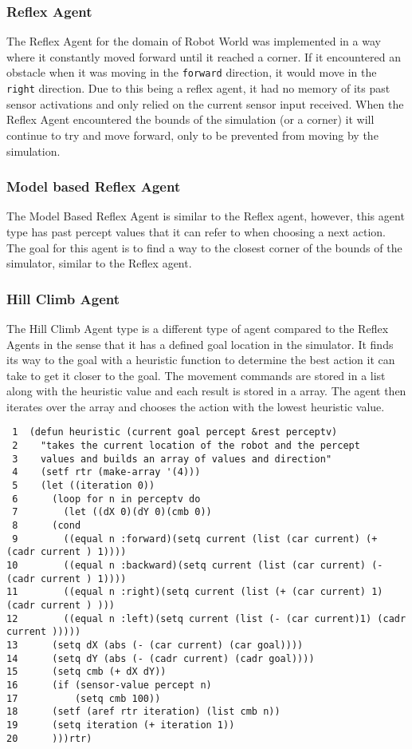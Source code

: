\documentclass[11pt]{article}
\begin{document}
\subsubsection{Reflex Agent}
\label{sec:org5c464e7}
The Reflex Agent for the domain of Robot World was implemented in a way
where it constantly moved forward until it reached a corner. If it encountered an obstacle when it was moving
in the \texttt{forward} direction, it would move in the \texttt{right} direction. Due to this being a reflex agent, it had
no memory of its past sensor activations and only relied on the current sensor input received. When the
Reflex Agent encountered the bounds of the simulation
(or a corner) it will continue to try and move forward, only to be prevented from moving by the simulation.
\subsubsection{Model based Reflex Agent}
\label{sec:org7be21d5}
The Model Based Reflex Agent is similar to the Reflex agent, however, this agent type has past percept
values that it can refer to when choosing a next action. The goal for this agent is to find a way to the closest
corner of the bounds of the simulator, similar to the Reflex agent. 
\subsubsection{Hill Climb Agent}
\label{sec:org05e792a}
The Hill Climb Agent type is a different type of agent compared to the Reflex Agents in the sense that
it has a defined goal location in the simulator. It finds its way to the goal with a heuristic function to
determine the best action it can take to get it closer to the goal. The movement commands are stored in
a list along with the heuristic value and each result is stored in a array. The agent then iterates
over the array and chooses the action with the lowest heuristic value.
\begin{verbatim}
 1  (defun heuristic (current goal percept &rest perceptv)
 2    "takes the current location of the robot and the percept
 3    values and builds an array of values and direction"
 4    (setf rtr (make-array '(4)))
 5    (let ((iteration 0))
 6      (loop for n in perceptv do
 7        (let ((dX 0)(dY 0)(cmb 0))
 8  	(cond
 9  	  ((equal n :forward)(setq current (list (car current) (+ (cadr current ) 1))))
10  	  ((equal n :backward)(setq current (list (car current) (- (cadr current ) 1))))
11  	  ((equal n :right)(setq current (list (+ (car current) 1) (cadr current ) )))
12  	  ((equal n :left)(setq current (list (- (car current)1) (cadr current )))))
13  	(setq dX (abs (- (car current) (car goal))))
14  	(setq dY (abs (- (cadr current) (cadr goal))))
15  	(setq cmb (+ dX dY))
16  	(if (sensor-value percept n)
17  	    (setq cmb 100))  
18  	(setf (aref rtr iteration) (list cmb n))
19  	(setq iteration (+ iteration 1))
20  	)))rtr)
\end{verbatim}
\end{document}
